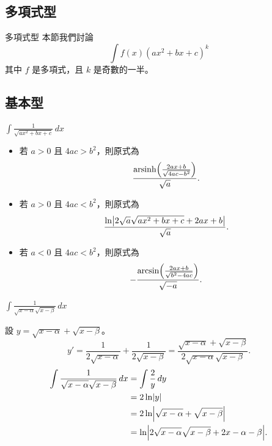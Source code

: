 \documentclass{beamer}
\newcommand{\Left} {\mathopen{}\mathclose\bgroup\left}
\newcommand{\Right}{\aftergroup\egroup\right}
\newcommand{\arsinh}{\operatorname{arsinh}}
\theoremstyle{remark}
\begin{document}
\begin{CJK}{UTF8}{bsmi}
\section{多項式型}
\begin{frame}{多項式型}
  本節我們討論
  \[\int f(x) \left( ax^2 + bx + c \right)^k\]
  其中 $f$ 是多項式，且 $k$ 是奇數的一半。
\end{frame}

\subsection{基本型}
\begin{frame}{$\displaystyle \int \frac{1}{\sqrt{ax^2 + bx + c}}\,dx$}
  \begin{itemize}
    \item 若 $a > 0$ 且 $4ac > b^2$，則原式為
      \[\frac{\arsinh \Left( \frac{2ax + b}{\sqrt{4ac - b^2}} \Right)}{\sqrt a}.\]
    \item 若 $a > 0$ 且 $4ac < b^2$，則原式為
      \[\frac{\ln \Left| 2 \sqrt a \sqrt{ax^2 + bx + c} + 2ax + b \Right|}{\sqrt a}.\]
    \item 若 $a < 0$ 且 $4ac < b^2$，則原式為
      \[-\frac{\arcsin \Left( \frac{2ax + b}{\sqrt{b^2 - 4ac}} \Right)}{\sqrt{-a}}.\]
  \end{itemize}
\end{frame}

\begin{frame}{$\displaystyle \int \frac{1}{\sqrt{x - \alpha} \sqrt{x - \beta}}\,dx$}
  \begin{solution}
    設 $y = \sqrt{x - \alpha} + \sqrt{x - \beta}$。
    \[y' = \frac{1}{2 \sqrt{x - \alpha}} + \frac{1}{2 \sqrt{x - \beta}}
      = \frac{\sqrt{x - \alpha} + \sqrt{x - \beta}}{2 \sqrt{x - \alpha} \sqrt{x - \beta}}.\]
    \begin{align*}
      \int \frac{1}{\sqrt{x - \alpha} \sqrt{x - \beta}}\,dx &= \int \frac{2}{y}\,dy\\
	&= 2 \ln \Left| y \Right|\\
	&= 2 \ln \Left| \sqrt{x - \alpha} + \sqrt{x - \beta} \Right|\\
	&= \ln \Left| 2 \sqrt{x - \alpha} \sqrt{x - \beta} + 2x - \alpha - \beta \Right|.
    \end{align*}
  \end{solution}
\end{frame}


\end{CJK}
\end{document}
